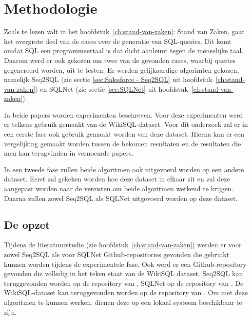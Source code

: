 
\chapter{Methodologie}
\label{ch:methodologie}


Zoals te lezen valt in het hoofdstuk~\ref{ch:stand-van-zaken}: Stand van Zaken, gaat het overgrote deel van de cases over de generatie van SQL-queries. Dit komt omdat SQL een programmeertaal is dat dicht aanleunt tegen de menselijke taal. Daarom werd er ook gekozen om twee van de gevonden cases, waarbij queries gegenereerd worden, uit te testen. Er werden gelijkaardige algorimten gekozen, namelijk Seq2SQL (zie sectie \ref{sec:Salesforce - Seq2SQL} uit hoofdstuk~\ref{ch:stand-van-zaken}) en SQLNet (zie sectie \ref{sec:SQLNet} uit hoofdstuk~\ref{ch:stand-van-zaken}).

In beide papers worden experimenten beschreven. Voor deze experimenten werd er telkens gebruik gemaakt van de WikiSQL-dataset. Voor dit onderzoek zal er in een eerste fase ook gebruik gemaakt worden van deze dataset. Hierna kan er een vergelijking gemaakt worden tussen de bekomen resultaten en de resultaten die men kan terugvinden in vernoemde papers. 

In een tweede fase zullen beide algoritmen ook uitgevoerd worden op een andere dataset. Eerst zal gekeken worden hoe deze dataset in elkaar zit en zal deze aangepast worden naar de vereisten om beide algoritmen werkend te krijgen. Daarna zullen zowel Seq2SQL als SQLNet uitgevoerd worden op deze dataset. 

\section{De opzet}

Tijdens de literatuurstudie (zie hoofdstuk~\ref{ch:stand-van-zaken}) werden er voor zowel Seq2SQL als voor SQLNet Github-repositories gevonden die gebruikt kunnen worden tijdens de experimentele fase. Ook werd er een Github-repository gevonden die volledig in het teken staat van de WikiSQL dataset. Seq2SQL kan teruggevonden worden op de repository van \textcite{seq2sql}, SQLNet op de repository van \textcite{sqlnet}. De WikiSQL-dataset kan teruggevonden worden op de repository van \textcite{wikisql}. Om met deze algoritmen te kunnen werken, dienen deze op een lokaal systeem beschikbaar te zijn. 

